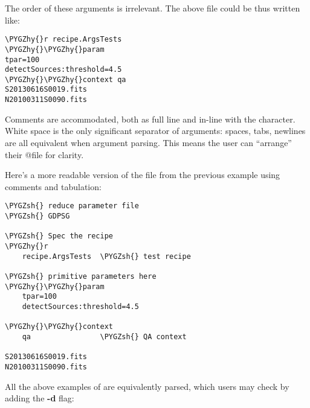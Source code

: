 \documentclass[letterpaper,10pt,english]{sphinxmanual}
\def\PYGZsh{\char`\#}
\def\PYGZhy{\char`\-}
\begin{document}
The order of these arguments is irrelevant. The above file could be thus written
like:

\begin{Verbatim}[commandchars=\\\{\}]
\PYGZhy{}r recipe.ArgsTests
\PYGZhy{}\PYGZhy{}param
tpar=100
detectSources:threshold=4.5
\PYGZhy{}\PYGZhy{}context qa
S20130616S0019.fits
N20100311S0090.fits
\end{Verbatim}

Comments are accommodated, both as full line and in-line with the \code{\#}
character.  White space is the only significant separator of arguments: spaces,
tabs, newlines are all equivalent when argument parsing.  This means
the user can ``arrange'' their @file for clarity.

Here's a more readable version of the file from the previous example
using comments and tabulation:

\begin{Verbatim}[commandchars=\\\{\}]
\PYGZsh{} reduce parameter file
\PYGZsh{} GDPSG

\PYGZsh{} Spec the recipe
\PYGZhy{}r
    recipe.ArgsTests  \PYGZsh{} test recipe

\PYGZsh{} primitive parameters here
\PYGZhy{}\PYGZhy{}param
    tpar=100
    detectSources:threshold=4.5

\PYGZhy{}\PYGZhy{}context
    qa                \PYGZsh{} QA context

S20130616S0019.fits
N20100311S0090.fits
\end{Verbatim}

All the above  examples of  are equivalently parsed, which
users may check by adding the \textbf{-d} flag:
\end{document}
